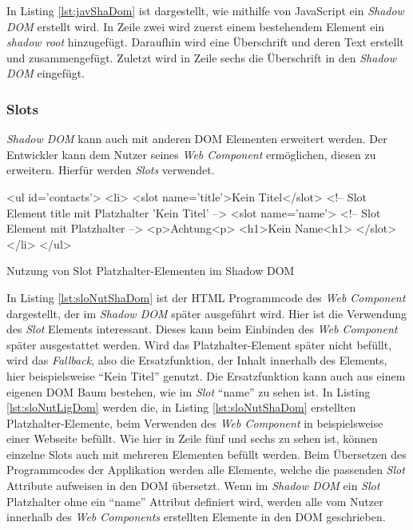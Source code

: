 \documentclass[12pt, paper=a4, bibtotoc, toc=listof, headsepline=true, numbers=endperiod]{scrreprt}
\begin{document}
		In Listing \ref{lst:javShaDom} ist dargestellt, wie mithilfe von JavaScript ein \emph{Shadow \ac{DOM}} erstellt wird. In Zeile zwei wird zuerst einem bestehendem Element ein \emph{shadow root} hinzugefügt. Daraufhin wird eine Überschrift und deren Text erstellt und zusammengefügt. Zuletzt wird in Zeile sechs die Überschrift in den \emph{Shadow \ac{DOM}} eingefügt.
			\subsubsection{Slots}
			\emph{Shadow \ac{DOM}} kann auch mit anderen \ac{DOM} Elementen erweitert werden. Der Entwickler kann dem Nutzer seines \emph{Web Component} ermöglichen, diesen zu erweitern. Hierfür werden \emph{Slots} verwendet. 
			\begin{listing}
				\begin{HTMLcode*}{}
<ul id='contacts'>
   <li>
      <slot name='title'>Kein Titel</slot> <!-- Slot Element title mit Platzhalter 'Kein Titel' -->
      <slot name='name'> <!-- Slot Element mit Platzhalter -->
         <p>Achtung<p>
         <h1>Kein Name<h1>
      </slot>
   </li>
</ul>
				\end{HTMLcode*}
				\caption[Slot Elemente im Shadow DOM]{Nutzung von Slot Platzhalter-Elementen im Shadow DOM}
				\label{lst:sloNutShaDom}
			\end{listing}
			In Listing \ref{lst:sloNutShaDom} ist der \ac{HTML} Programmcode des \emph{Web Component} dargestellt, der im \emph{Shadow \ac{DOM}} später ausgeführt wird. Hier ist die Verwendung des \emph{Slot} Elements interessant. Dieses kann beim Einbinden des \emph{Web Component} später ausgestattet werden. Wird das Platzhalter-Element später nicht befüllt, wird das \emph{Fallback}, also die Ersatzfunktion, der Inhalt innerhalb des Elements, hier beispielsweise \enquote{Kein Titel} genutzt. Die Ersatzfunktion kann auch aus einem eigenen \ac{DOM} Baum bestehen, wie im \emph{Slot} \enquote{name} zu sehen ist\cite{Bidelman2016}. In Listing \ref{lst:sloNutLigDom} werden die, in Listing \ref{lst:sloNutShaDom} erstellten Platzhalter-Elemente, beim Verwenden des \emph{Web Component} in beispielsweise einer Webseite befüllt. Wie hier in Zeile fünf und sechs zu sehen ist, können einzelne Slots auch mit mehreren Elementen befüllt werden. Beim Übersetzen des Programmcodes der Applikation werden alle Elemente, welche die passenden \emph{Slot} Attribute aufweisen in den \ac{DOM} übersetzt. Wenn im \emph{Shadow \ac{DOM}} ein \emph{Slot} Platzhalter ohne ein \enquote{name} Attribut definiert wird, werden alle vom Nutzer innerhalb des \emph{Web Components} erstellten Elemente in den \ac{DOM} geschrieben.
\end{document}

